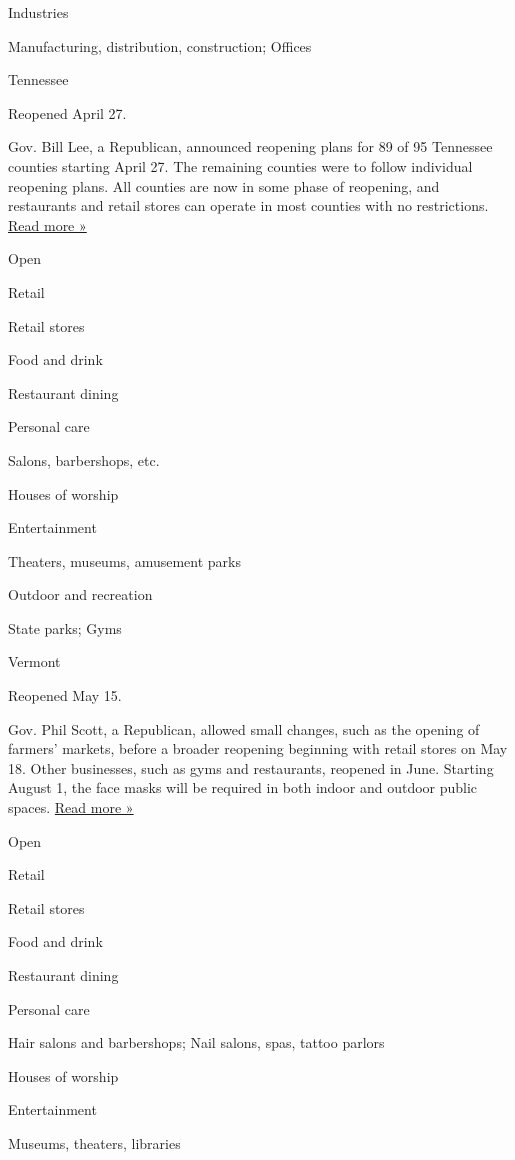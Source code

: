 Industries

Manufacturing, distribution, construction; Offices

Tennessee

Reopened April 27.

Gov. Bill Lee, a Republican, announced reopening plans for 89 of 95
Tennessee counties starting April 27. The remaining counties were to
follow individual reopening plans. All counties are now in some phase of
reopening, and restaurants and retail stores can operate in most
counties with no restrictions.
\href{https://www.wsmv.com/news/tennessee-releases-new-guidelines-for-reopening-restaurants-retail-and-large-attractions/article_0f74cd22-9ad3-11ea-9f03-e3784e1e4029.html}{Read
more »}

Open

Retail

Retail stores

Food and drink

Restaurant dining

Personal care

Salons, barbershops, etc.

Houses of worship

Entertainment

Theaters, museums, amusement parks

Outdoor and recreation

State parks; Gyms

Vermont

Reopened May 15.

Gov. Phil Scott, a Republican, allowed small changes, such as the
opening of farmers' markets, before a broader reopening beginning with
retail stores on May 18. Other businesses, such as gyms and restaurants,
reopened in June. Starting August 1, the face masks will be required in
both indoor and outdoor public spaces.
\href{https://vtdigger.org/2020/07/24/scott-orders-mask-mandate/}{Read
more »}

Open

Retail

Retail stores

Food and drink

Restaurant dining

Personal care

Hair salons and barbershops; Nail salons, spas, tattoo parlors

Houses of worship

Entertainment

Museums, theaters, libraries

